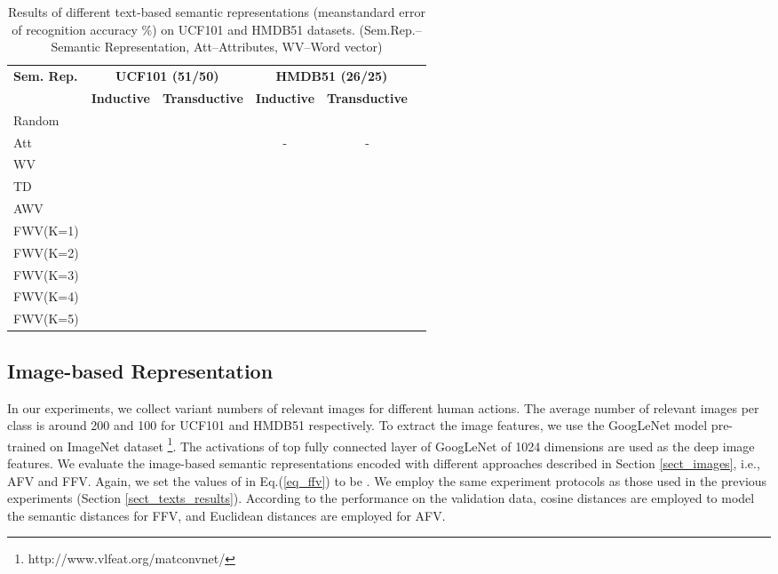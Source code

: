 \documentclass[runningheads,a4paper] {llncs}
\begin{document}
\begin{table*}[t]
{\normalsize
\centering
\caption[]{Results of different text-based semantic representations (meanstandard error of recognition accuracy \%) on UCF101 and HMDB51 datasets. (Sem.Rep.--Semantic Representation, Att--Attributes, WV--Word vector)
}
\label{table_texts}

\begin{lrbox}{\tablebox}
\begin{tabular}{@{}lccccc}\toprule
  \multirow{2}{*}{\textbf{Sem. Rep.}} & \multicolumn{2}{c}{\textbf{UCF101 (51/50)}} & \multicolumn{2}{c}{\textbf{HMDB51 (26/25)} }\\
  \cmidrule(l){2-5}
  & \textbf{Inductive} & \textbf{Transductive} & \textbf{Inductive} & \textbf{Transductive}  \\ \midrule
Random  & 		   &           &           &  \\
Att		&   &  & -			   & - \\
WV		&   &  &  &  \\
TD	     &  &  &  &  \\
AWV 	 &  &  &  &  \\
FWV(K=1) &  &  &  &  \\
FWV(K=2) &  &  &  &  \\
FWV(K=3) &  &  &  &  \\
FWV(K=4) &  &  &  &  \\
FWV(K=5) &  &  &  &  \\
\bottomrule
\end{tabular}
\end{lrbox}
\scalebox{0.8}{\usebox{\tablebox}}
}
\end{table*}


\subsection{Image-based Representation}
In our experiments, we collect variant numbers of relevant images for different human actions. The average number of relevant images per class is around 200 and 100 for UCF101 and HMDB51 respectively. To extract the image features, we use the GoogLeNet \cite{szegedy2015going} model pre-trained on ImageNet dataset \footnote{http://www.vlfeat.org/matconvnet/}. The activations of top fully connected layer of GoogLeNet of 1024 dimensions are used as the deep image features. We evaluate the image-based semantic representations encoded with different approaches described in Section \ref{sect_images}, i.e., AFV and FFV. Again, we set the values of  in Eq.(\ref{eq_ffv}) to be . We employ the same experiment protocols as those used in the previous experiments (Section \ref{sect_texts_results}). According to the performance on the validation data, cosine distances are employed to model the semantic distances for FFV, and Euclidean distances are employed for AFV.
\end{document}

